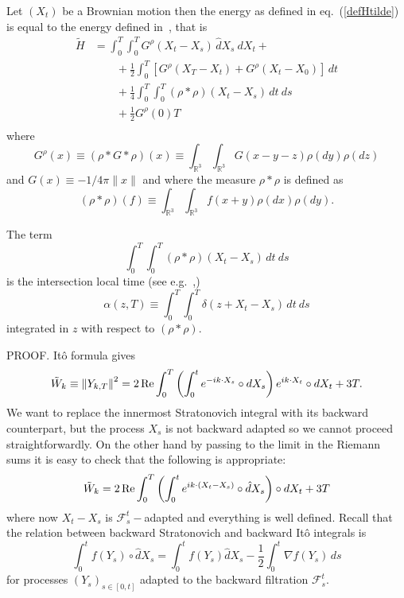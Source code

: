 \begin{theorem}
\label{th:equivalence}
Let $(X_t)$ be a Brownian motion  then the
energy as defined in eq.~(\ref{defHtilde}) is equal to the energy defined
in~\cite{Fl2}, that is
\begin{equation}
\begin{split}
\tilde{H} & =  \int_0^T \!\int_0^T  G^\rho(X_t-X_s)\, \hat{d}X_s~dX_t + \\
& \qquad + \frac{1}{2} \int_0^T \left[G^\rho(X_T-X_t) + G^\rho(X_t-X_0)\right]\, dt \\
& \qquad + \frac{1}{4} \int_0^T\! \int_0^T (\rho * \rho)(X_t-X_s)\, dt~ds \\
& \qquad + \frac{1}{2} G^\rho(0) T \\
\end{split}
\label{equivalence}
\end{equation}
where 
$$
G^\rho(x) \equiv (\rho * G * \rho)(x) \equiv \int_{\mathbb{R}^3} \int_{\mathbb{R}^3} G(x-y-z)
\rho(dy) \rho(dz)
$$
and $G(x) \equiv - 1/4 \pi \|x\|$ and where the
measure $\rho * \rho$ is defined as
$$
(\rho * \rho)(f) \equiv \int_{\mathbb{R}^3} \int_{\mathbb{R}^3} f(x+y) \rho(dx) \rho(dy).
$$
\end{theorem}
\begin{remark}
The term 
$$
 \int_0^T\! \int_0^T (\rho * \rho)(X_t-X_s)\, dt~ds
$$
is the intersection local time (see e.g.~\cite{LeG1},\cite{Yo2})
$$
 \alpha(z, T) \equiv \int_0^T\! \int_0^T \delta(z+X_t-X_s)\, dt~ds
$$
integrated in $z$ with respect to $(\rho * \rho)$.
\end{remark}

PROOF. 
It\^o formula gives
\begin{equation*}
\tilde{W}_k  \equiv  \left\| Y_{k,T} \right\|^2 
 =  
2 \operatorname{Re} \int_0^T \left( \int_0^t e^{-ik \cdot X_s} \circ dX_s \right) e^{ik \cdot X_t}
\circ dX_t + 3 T. 
\end{equation*}
We want to replace the innermost Stratonovich integral with its
backward counterpart, but the process $X_s$ is not backward adapted so we
cannot proceed straightforwardly. On the other hand by passing to the limit in
the Riemann sums it is easy to check that the following is appropriate:
\begin{equation*}
\tilde{W}_k =  
2 \operatorname{Re} \int_0^T \left( \int_0^t e^{ik \cdot (X_t-X_s)} \circ \hat{d}X_s \right) 
\circ dX_t + 3 T
\end{equation*}
where now $X_t-X_s$ is $\mathcal{F}^t_s-$adapted and everything is well defined. 
Recall that the relation between backward Stratonovich and backward
It\^o integrals is
$$
\int_0^t f(Y_s)\circ \hat{d}X_s = \int_0^t f(Y_s)\hat{d}X_s -
\frac{1}{2} \int_0^t \nabla f(Y_s) \,ds
$$
for processes $(Y_s)_{s\in[0,t]}$ adapted to the backward filtration $\mathcal{F}^t_s$.

